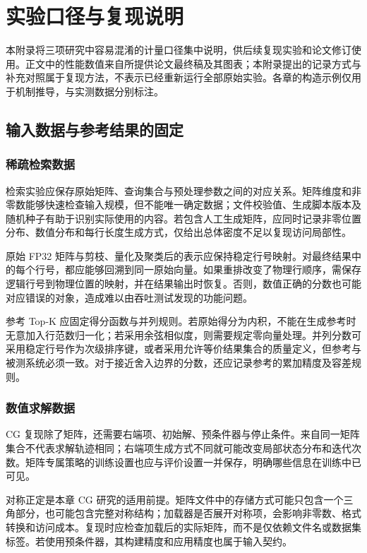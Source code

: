 \chapter{实验口径与复现说明}
本附录将三项研究中容易混淆的计量口径集中说明，供后续复现实验和论文修订使用。正文中的性能数值来自所提供论文最终稿及其图表；本附录提出的记录方式与补充对照属于复现方法，不表示已经重新运行全部原始实验。各章的构造示例仅用于机制推导，与实测数据分别标注。

\section{输入数据与参考结果的固定}
\subsection{稀疏检索数据}
检索实验应保存原始矩阵、查询集合与预处理参数之间的对应关系。矩阵维度和非零数能够快速检查输入规模，但不能唯一确定数据；文件校验值、生成脚本版本及随机种子有助于识别实际使用的内容。若包含人工生成矩阵，应同时记录非零位置分布、数值分布和每行长度生成方式，仅给出总体密度不足以复现访问局部性。

原始 FP32 矩阵与剪枝、量化及聚类后的表示应保持稳定行号映射。对最终结果中的每个行号，都应能够回溯到同一原始向量。如果重排改变了物理行顺序，需保存逻辑行号到物理位置的映射，并在结果输出时恢复。否则，数值正确的分数也可能对应错误的对象，造成难以由吞吐测试发现的功能问题。

参考 Top-K 应固定得分函数与并列规则。若原始得分为内积，不能在生成参考时无意加入行范数归一化；若采用余弦相似度，则需要规定零向量处理。并列分数可采用稳定行号作为次级排序键，或者采用允许等价结果集合的质量定义，但参考与被测系统必须一致。对于接近舍入边界的分数，还应记录参考的累加精度及容差规则。

\subsection{数值求解数据}
CG 复现除了矩阵，还需要右端项、初始解、预条件器与停止条件。来自同一矩阵集合不代表求解轨迹相同；右端项生成方式不同就可能改变局部状态分布和迭代次数。矩阵专属策略的训练设置也应与评价设置一并保存，明确哪些信息在训练中已可见。

对称正定是本章 CG 研究的适用前提。矩阵文件中的存储方式可能只包含一个三角部分，也可能包含完整对称结构；加载器是否展开对称项，会影响非零数、格式转换和访问成本。复现时应检查加载后的实际矩阵，而不是仅依赖文件名或数据集标签。若使用预条件器，其构建精度和应用精度也属于输入契约。

